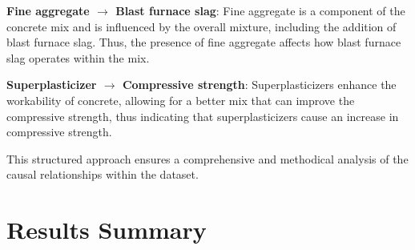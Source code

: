 \documentclass{article}
\begin{document}
\item \textbf{Fine aggregate $\rightarrow$ Blast furnace slag}: Fine aggregate is a component of the concrete mix and is influenced by the overall mixture, including the addition of blast furnace slag. Thus, the presence of fine aggregate affects how blast furnace slag operates within the mix.

\item \textbf{Superplasticizer $\rightarrow$ Compressive strength}: Superplasticizers enhance the workability of concrete, allowing for a better mix that can improve the compressive strength, thus indicating that superplasticizers cause an increase in compressive strength.

            
This structured approach ensures a comprehensive and methodical analysis of the causal relationships within the dataset.
        

\section{Results Summary}
\end{document}
